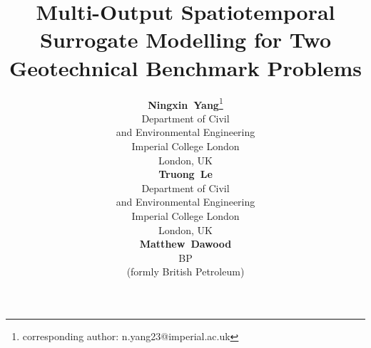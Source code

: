 \title{Multi-Output Spatiotemporal Surrogate Modelling for Two Geotechnical Benchmark Problems}

\author{
 \textbf{Ningxin~Yang}\thanks{corresponding author: n.yang23@imperial.ac.uk}\\
Department of Civil \\ and Environmental Engineering \\ Imperial College London\\  London, UK\\
 	\And
	\textbf{Truong~Le}\\
Department of Civil \\ and Environmental Engineering \\ Imperial College London\\  London, UK\\ 
 	\And
	\textbf{Matthew~Dawood}\\
BP \\ (formly British Petroleum)
}

\renewcommand{\shorttitle}{}